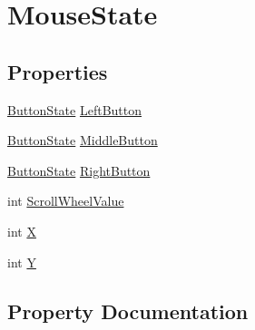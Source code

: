 \hypertarget{structMicrosoft_1_1Xna_1_1Framework_1_1Input_1_1MouseState}{}\section{Mouse\+State}
\label{structMicrosoft_1_1Xna_1_1Framework_1_1Input_1_1MouseState}
\subsection*{Properties}
\begin{DoxyCompactItemize}
\item 
\hyperlink{namespaceMicrosoft_1_1Xna_1_1Framework_1_1Input_aa46074d34fe2d6631c6bd9dc74633657}{Button\+State} \hyperlink{structMicrosoft_1_1Xna_1_1Framework_1_1Input_1_1MouseState_a256bb1b11d67c7e6ef3e1146afddf2f7}{Left\+Button}
\item 
\hyperlink{namespaceMicrosoft_1_1Xna_1_1Framework_1_1Input_aa46074d34fe2d6631c6bd9dc74633657}{Button\+State} \hyperlink{structMicrosoft_1_1Xna_1_1Framework_1_1Input_1_1MouseState_acb427343d5f713322872be0f45b8b4f3}{Middle\+Button}
\item 
\hyperlink{namespaceMicrosoft_1_1Xna_1_1Framework_1_1Input_aa46074d34fe2d6631c6bd9dc74633657}{Button\+State} \hyperlink{structMicrosoft_1_1Xna_1_1Framework_1_1Input_1_1MouseState_aac8618471557dfd68e27f37c142481f6}{Right\+Button}
\item 
int \hyperlink{structMicrosoft_1_1Xna_1_1Framework_1_1Input_1_1MouseState_a953d824040e6f3cbd8fa95daa201180f}{Scroll\+Wheel\+Value}
\item 
int \hyperlink{structMicrosoft_1_1Xna_1_1Framework_1_1Input_1_1MouseState_a80c0944640e62d3ed6c5419c1bcc0c88}{X}
\item 
int \hyperlink{structMicrosoft_1_1Xna_1_1Framework_1_1Input_1_1MouseState_aa482c4cc86a24474e4fb19b5b5978778}{Y}
\end{DoxyCompactItemize}


\subsection{Property Documentation}
\hypertarget{structMicrosoft_1_1Xna_1_1Framework_1_1Input_1_1MouseState_a256bb1b11d67c7e6ef3e1146afddf2f7}{}
